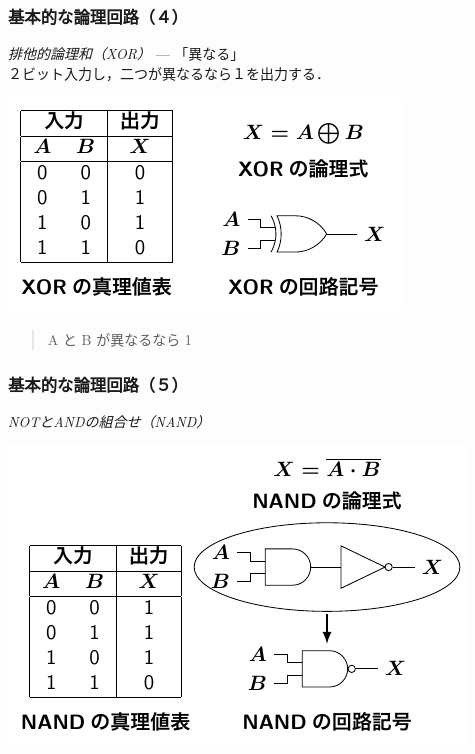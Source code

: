 \documentclass[handout]{beamer}        %
\begin{document}
\begin{frame}
  \frametitle{基本的な論理回路（４）}
  \emph{排他的論理和（XOR）} --- 「異なる」\\
  \vfill
  ２ビット入力し，二つが異なるなら１を出力する．
  \centerline{\includegraphics[scale=1.4]{../Tikz/xor.pdf}}
  \begin{quote}
    A と B が異なるなら 1\\
  \end{quote}
  \vfill
\end{frame}

\begin{frame}
  \frametitle{基本的な論理回路（５）}
  \emph{NOTとANDの組合せ（NAND）} \\
  \vfill
  \centerline{\includegraphics[scale=1.3]{../Tikz/nand.pdf}}
  \vfill
\end{frame}
\end{document}
